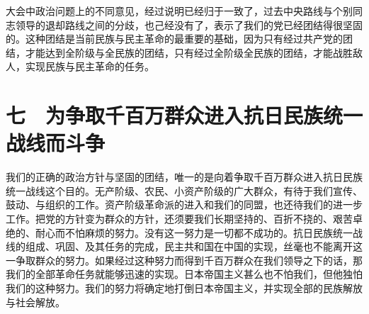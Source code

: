 大会中政治问题上的不同意见，经过说明已经归于一致了，过去中央路线与个别同志领导的退却路线之间的分歧，也己经没有了，表示了我们的党已经团结得很坚固的。这种团结是当前民族与民主革命的最重要的基础，因为只有经过共产党的团结，才能达到全阶级与全民族的团结，只有经过全阶级全民族的团结，才能战胜敌人，实现民族与民主革命的任务。

\section{七　为争取千百万群众进入抗日民族统一战线而斗争}

我们的正确的政治方针与坚固的团结，唯一的是向着争取千百万群众进入抗日民族统一战线这个目的。无产阶级、农民、小资产阶级的广大群众，有待于我们宣传、鼓动、与组织的工作。资产阶级革命派的进入和我们的同盟，也还待我们的进一步工作。把党的方针变为群众的方针，还须要我们长期坚持的、百折不挠的、艰苦卓绝的、耐心而不怕麻烦的努力。没有这一努力是一切都不成功的。抗日民族统一战线的组成、巩固、及其任务的完成，民主共和国在中国的实现，丝毫也不能离开这一争取群众的努力。如果经过这种努力而得到千百万群众在我们领导之下的话，那我们的全部革命任务就能够迅速的实现。日本帝国主义甚么也不怕我们，但他独怕我们的这种努力。我们的努力将确定地打倒日本帝国主义，并实现全部的民族解放与社会解放。
